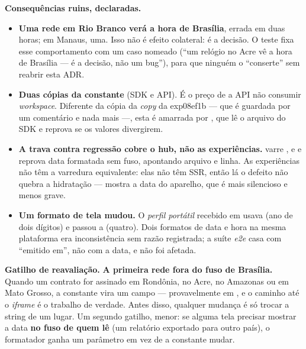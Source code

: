 \textbf{Consequências ruins, declaradas.}

\begin{itemize}
  \item \textbf{Uma rede em Rio Branco verá a hora de Brasília}, errada em duas
    horas; em Manaus, uma. Isso não é efeito colateral: é a decisão. O teste
     fixa esse comportamento com um caso
    nomeado (\enquote{um relógio no Acre vê a hora de Brasília --- é a decisão,
    não um bug}), para que ninguém o \enquote{conserte} sem reabrir esta ADR.
  \item \textbf{Duas cópias da constante} (SDK e API). É o preço de a API não
    consumir \emph{workspace}. Diferente da cópia da \emph{copy} da exp08ef1b ---
    que é guardada por um comentário e nada mais ---, esta é amarrada por
    , que lê o arquivo do SDK e
    reprova se os valores divergirem.
  \item \textbf{A trava contra regressão cobre o hub, não as experiências.}
     varre ,
     e  e reprova data formatada sem fuso, apontando
    arquivo e linha. As experiências não têm a varredura equivalente: elas não
    têm SSR, então lá o defeito não quebra a hidratação --- mostra a data do
    aparelho, que é mais silencioso e menos grave.
  \item \textbf{Um formato de tela mudou.} O \emph{perfil portátil} recebido em
     usava  (ano de dois dígitos)
    e passou a  (quatro). Dois formatos de data e hora na mesma
    plataforma era inconsistência sem razão registrada; a suíte \emph{e2e} casa
    com \enquote{emitido em}, não com a data, e não foi afetada.
\end{itemize}

\textbf{Gatilho de reavaliação.} \textbf{A primeira rede fora do fuso de
Brasília.} Quando um contrato for assinado em Rondônia, no Acre, no Amazonas ou
em Mato Grosso, a constante vira um campo --- provavelmente em , e o
caminho até o \emph{iframe} é o trabalho de verdade. Antes disso, qualquer
mudança é só trocar a string de um lugar. Um segundo gatilho, menor: se alguma
tela precisar mostrar a data \textbf{no fuso de quem lê} (um relatório exportado
para outro país), o formatador ganha um parâmetro em vez de a constante mudar.


